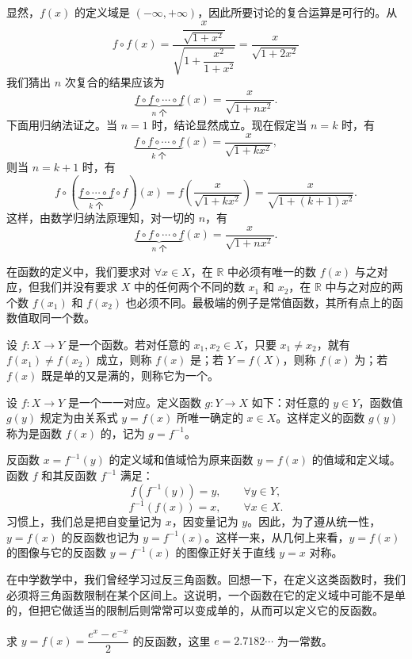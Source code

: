 \documentclass[UTF8,12pt,a4paper,fontset=fandol]{ctexbook}
\begin{document}
\noindent{}\quad 显然，$f(x)$ 的定义域是 $(-\infty,+\infty)$，因此所要讨论的复合运算是可行的。从
\[
  f\circ f(x)=
  \frac{\dfrac{x}{\sqrt{1+x^2}}}{\sqrt{1+\dfrac{x^2}{1+x^2}}}
  =\frac{x}{\sqrt{1+2x^2}}
\]
我们猜出 $n$ 次复合的结果应该为
\[
  \underbrace{f\circ f\circ\cdots\circ f}_{n\text{ 个}}(x)=\frac{x}{\sqrt{1+nx^2}}.
\]
下面用归纳法证之。当 $n=1$ 时，结论显然成立。现在假定当 $n=k$ 时，有
\[
  \underbrace{f\circ f\circ\cdots\circ f}_{k\text{ 个}}(x)=\frac{x}{\sqrt{1+kx^2}},
\]
则当 $n=k+1$ 时，有
\[
  f\circ(\underbrace{f\circ\cdots\circ f}_{k\text{ 个}}\circ f)(x)
  =f\left(\frac{x}{\sqrt{1+kx^2}}\right)
  =\frac{x}{\sqrt{1+(k+1)x^2}}.
\]
这样，由数学归纳法原理知，对一切的 $n$，有
\[
  \underbrace{f\circ f\circ\cdots\circ f}_{n\text{ 个}}(x)=\frac{x}{\sqrt{1+nx^2}}.
\]

\noindent{}

在函数的定义中，我们要求对 $\forall x\in X$，在 $\mathbb{R}$ 中必须有唯一的数 $f(x)$ 与之对应，但我们并没有要求 $X$ 中的任何两个不同的数 $x_1$ 和 $x_2$，在 $\mathbb{R}$ 中与之对应的两个数 $f(x_1)$ 和 $f(x_2)$ 也必须不同。最极端的例子是常值函数，其所有点上的函数值取同一个数。

设 $f:X\to Y$ 是一个函数。若对任意的 $x_1,x_2\in X$，只要 $x_1\ne x_2$，就有 $f(x_1)\ne f(x_2)$ 成立，则称 $f(x)$ 是；若 $Y=f(X)$，则称 $f(x)$ 为；若 $f(x)$ 既是单的又是满的，则称它为一个。

\noindent{}\quad 设 $f:X\to Y$ 是一个一一对应。定义函数 $g:Y\to X$ 如下：对任意的 $y\in Y$，函数值 $g(y)$ 规定为由关系式 $y=f(x)$ 所唯一确定的 $x\in X$。这样定义的函数 $g(y)$ 称为是函数 $f(x)$ 的，记为 $g=f^{-1}$。

反函数 $x=f^{-1}(y)$ 的定义域和值域恰为原来函数 $y=f(x)$ 的值域和定义域。函数 $f$ 和其反函数 $f^{-1}$ 满足：
\[
  f(f^{-1}(y))=y,\qquad \forall y\in Y,
\]
\[
  f^{-1}(f(x))=x,\qquad \forall x\in X.
\]
习惯上，我们总是把自变量记为 $x$，因变量记为 $y$。因此，为了遵从统一性，$y=f(x)$ 的反函数也记为 $y=f^{-1}(x)$。这样一来，从几何上来看，$y=f(x)$ 的图像与它的反函数 $y=f^{-1}(x)$ 的图像正好关于直线 $y=x$ 对称。

在中学数学中，我们曾经学习过反三角函数。回想一下，在定义这类函数时，我们必须将三角函数限制在某个区间上。这说明，一个函数在它的定义域中可能不是单的，但把它做适当的限制后则常常可以变成单的，从而可以定义它的反函数。

\noindent{}\quad 求 $y=f(x)=\dfrac{e^x-e^{-x}}{2}$ 的反函数，这里 $e=2.7182\cdots$ 为一常数。
\end{document}
